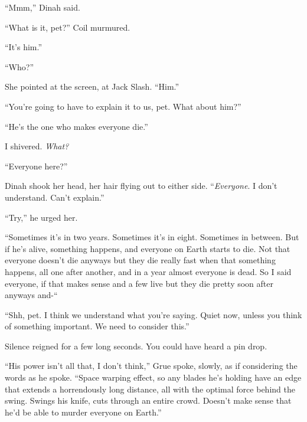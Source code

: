 ``Mmm,'' Dinah said.



``What is it, pet?'' Coil murmured.



``It's him.''



``Who?''



She pointed at the screen, at Jack Slash.  ``Him.''



``You're going to have to explain it to us, pet.  What about him?''



``He's the one who makes everyone die.''



I shivered.  \emph{What?}



``Everyone here?''



Dinah shook her head, her hair flying out to either side.  ``\emph{Everyone}.  I don't understand.  Can't explain.''



``Try,'' he urged her.



``Sometimes it's in two years.  Sometimes it's in eight.  Sometimes in between.  But if he's alive, something happens, and everyone on Earth starts to die.  Not that everyone doesn't die anyways but they die really fast when that something happens, all one after another, and in a year almost everyone is dead.  So I said everyone, if that makes sense and a few live but they die pretty soon after anyways and-``



``Shh, pet.  I think we understand what you're saying.  Quiet now, unless you think of something important.  We need to consider this.''



Silence reigned for a few long seconds.  You could have heard a pin drop.



``His power isn't all that, I don't think,'' Grue spoke, slowly, as if considering the words as he spoke.  ``Space warping effect, so any blades he's holding have an edge that extends a horrendously long distance, all with the optimal force behind the swing.  Swings his knife, cuts through an entire crowd.  Doesn't make sense that he'd be able to murder everyone on Earth.''



